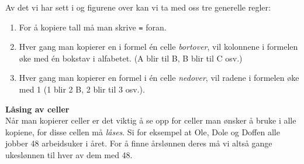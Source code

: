 Av det vi har sett i  og figurene over kan vi ta med oss tre generelle regler:
\begin{enumerate}
	\item For å kopiere tall må man skrive {\tt =} foran.
	\item Hver gang man kopierer en i formel én celle \textsl{bortover}, vil kolonnene i formelen øke med én bokstav i alfabetet. (A blir til B, B blir til C osv.)
		\item Hver gang man kopierer en formel i én celle \textsl{nedover}, vil radene i formelen øke med 1 (1 blir 2 B, 2 blir til 3 osv.).
\end{enumerate}

\textbf{Låsing av celler}\\[2pt]
Når man kopierer celler er det viktig å se opp for celler man ønsker å bruke i alle kopiene, for disse cellen må \textit{låses}. Si for eksempel at Ole, Dole og Doffen alle jobber 48 arbeidsuker i året. For å finne årslønnen deres må vi altså gange ukeslønnen til hver av dem med 48. \vsk

